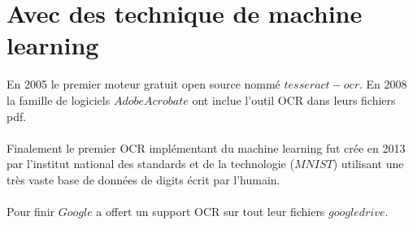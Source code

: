 \section{Avec des technique de machine learning}
En 2005 le premier moteur gratuit open source nommé $tesseract-ocr$. En 2008 la famille de logiciels $Adobe Acrobate$ ont inclue l'outil OCR dans leurs fichiers pdf.\\
\\
Finalement le premier OCR implémentant du machine learning fut crée en 2013 par l'institut national des standards et de la technologie ($MNIST$) utilisant une très vaste base de données de digits écrit par l'humain.\\
\\
Pour finir $Google$ a offert un support OCR sur tout leur fichiers $google drive$.\\
\\

\pagebreak